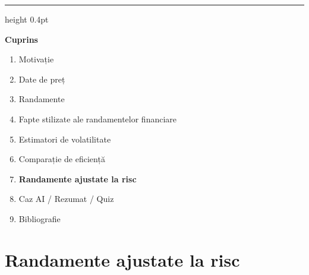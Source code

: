 \documentclass[9pt, aspectratio=169, t]{beamer}
\theoremstyle{definition}
\begin{document}
{
\begin{frame}{}
    {\color{FooterGray}\hrule height 0.4pt}
    \vspace{0.1cm}
    {\Large\textcolor{IDAred}{\textbf{Cuprins}}}
    \vspace{0.2cm}
    \begin{enumerate}
        \item Motivație \checkmark
        \item Date de preț \checkmark
        \item Randamente \checkmark
        \item Fapte stilizate ale randamentelor financiare \checkmark
        \item Estimatori de volatilitate \checkmark
        \item Comparație de eficiență \checkmark
        \item \textbf{Randamente ajustate la risc}
        \item Caz AI / Rezumat / Quiz
        \item Bibliografie
    \end{enumerate}
\end{frame}
}

\section{Randamente ajustate la risc}
\end{document}
